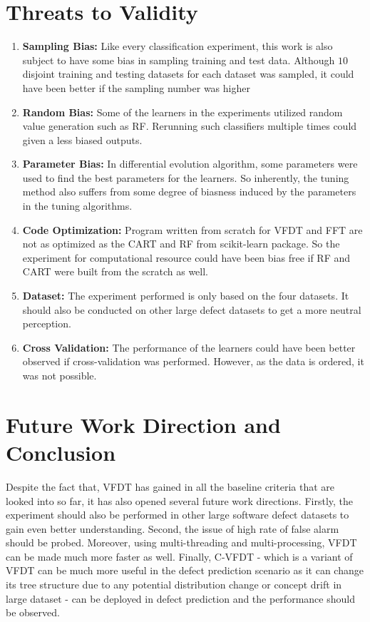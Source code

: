 \documentclass[sigplan]{acmart}\settopmatter{printfolios=true,printccs=false,printacmref=false}
\begin{document}
\section{Threats to Validity}
\begin{enumerate}
	\item \textbf{Sampling Bias: } Like every classification experiment, this work is also subject to have some bias in sampling training and test data. Although $10$ disjoint training and testing datasets for each dataset was sampled, it could have been better if the sampling number was higher
	\item \textbf{Random Bias: } Some of the learners in the experiments utilized random value generation such as RF. Rerunning such classifiers multiple times could given a less biased outputs.
	\item \textbf{Parameter Bias: } In differential evolution algorithm, some parameters were used to find the best parameters for the learners. So inherently, the tuning method also suffers from some degree of biasness induced by the parameters in the tuning algorithms.
	\item \textbf{Code Optimization: } Program written from scratch for VFDT and FFT are not as optimized as the CART and RF from scikit-learn package. So the experiment for computational resource could have been bias free if RF and CART were built from the scratch as well.
	\item \textbf{Dataset: } The experiment performed is only based on the four datasets. It should also be conducted on other large defect datasets to get a more neutral perception.
	\item \textbf{Cross Validation: } The performance of the learners could have been better observed if cross-validation was performed. However, as the data is ordered, it was not possible.
\end{enumerate}

\section{Future Work Direction and Conclusion}
Despite the fact that, VFDT has gained in all the baseline criteria that are looked into so far, it has also opened several future work directions. Firstly, the experiment should also be performed in other large software defect datasets to gain even better understanding. Second, the issue of high rate of false alarm should be probed. Moreover, using multi-threading and multi-processing, VFDT can be made much more faster as well. Finally, C-VFDT \cite{hulten2001mining} - which is a variant of VFDT can be much more useful in the defect prediction scenario as it can change its tree structure due to any potential distribution change or concept drift in large dataset \cite{vzliobaite2010learning} - can be deployed in defect prediction and the performance should be observed.



%
%
\end{document}
